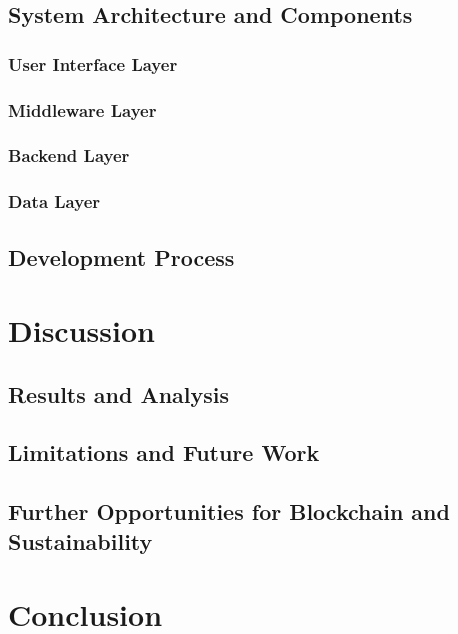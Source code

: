 \documentclass[11pt]{report}
\begin{document}
\section{System Architecture and Components}
\subsection{User Interface Layer}
\subsection{Middleware Layer}
\subsection{Backend Layer}
\subsection{Data Layer}
\section{Development Process}

\chapter{Discussion}
\section{Results and Analysis}



\newpage


\section{Limitations and Future Work} \label{se:limitations}
\section{Further Opportunities for Blockchain and Sustainability}

\chapter{Conclusion}



\end{document}
